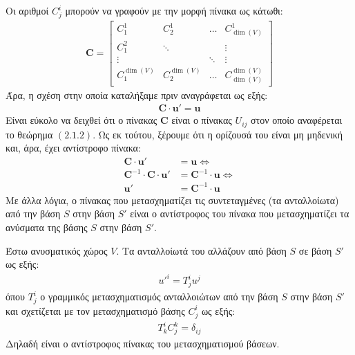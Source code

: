 \documentclass[main.tex]{subfiles}
\begin{document}
	Οι αριθμοί $C^i_j$ μπορούν να γραφούν με την μορφή πίνακα ως κάτωθι:
	\begin{align*}
		\boldsymbol{C} = \begin{bmatrix}
			C^1_1 & C^1_2 & \ldots & C^1_{\dim(V)} \\
			C^2_1 & \ddots & & \vdots\\
			\vdots & & \ddots & \vdots \\
			C^{\dim(V)}_1 & C^{\dim(V)}_2 & \ldots & C^{\dim(V)}_{\dim(V)}
		\end{bmatrix}
	\end{align*}
	Άρα, η σχέση στην οποία καταλήξαμε πριν αναγράφεται ως εξής:
	\begin{align*}
		\boldsymbol{C}\cdot\boldsymbol{u'} = \boldsymbol{u}
	\end{align*}
	Είναι εύκολο να δειχθεί ότι ο πίνακας $\boldsymbol{C}$ είναι ο πίνακας $U_{ij}$ στον οποίο αναφέρεται το θεώρημα $(2.1.2)$. Ως εκ τούτου, ξέρουμε ότι η ορίζουσά του είναι μη μηδενική και, άρα, έχει αντίστροφο πίνακα:
	\begin{align*}
		\boldsymbol{C}\cdot\boldsymbol{u}' &= \boldsymbol{u} \Leftrightarrow\\
		\boldsymbol{C}^{-1}\cdot\boldsymbol{C}\cdot\boldsymbol{u}' &= \boldsymbol{C}^{-1}\cdot\boldsymbol{u} \Leftrightarrow\\
		\boldsymbol{u}' &= \boldsymbol{C}^{-1}\cdot\boldsymbol{u}
	\end{align*}
	Με άλλα λόγια, ο πίνακας που μετασχηματίζει τις συντεταγμένες (τα ανταλλοίωτα) από την βάση $S$ στην βάση $S'$ είναι ο αντίστροφος του πίνακα που μετασχηματίζει τα ανύσματα της βάσης $S$ στην βάση $S'$. 
	
	\begin{theorem}
		Έστω ανυσματικός χώρος $V$. Τα ανταλλοίωτά του αλλάζουν από βάση $S$ σε βάση $S'$ ως εξής:
		\begin{align*}
			u'^i = T^i_ju^j
		\end{align*}
		όπου $T^i_j$ ο γραμμικός μετασχηματισμός ανταλλοιώτων από την βάση $S$ στην βάση $S'$ και σχετίζεται με τον μετασχηματισμό βάσης $C^i_j$ ως εξής:
		\begin{align*}
			T^i_kC^k_j = \delta_{ij}
		\end{align*}
		Δηλαδή είναι ο αντίστροφος πίνακας του μετασχηματισμού βάσεων.
	\end{theorem}
	
\end{document}
